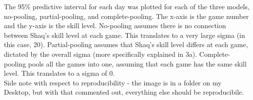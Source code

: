 \documentclass{article}\usepackage[]{graphicx}\usepackage[]{color}
\begin{document}
\noindent The 95\% predictive interval for each day was plotted for each of the three models, no-pooling, partial-pooling, and complete-pooling. The x-axis is the game number and the y-axis is the skill level. No-pooling assumes there is no connection between Shaq's skill level at each game. This translates to a very large sigma (in this case, 20). Partial-pooling assumes that Shaq's skill level differs at each game, dictated by the overall sigma (more specifically explained in 3a). Complete-pooling pools all the games into one, assuming that each game has the same skill level. This translates to a sigma of 0. \\

\noindent *Side note with respect to reproducibility - the image is in a folder on my Desktop, but with that commented out, everything else should be reproducibile. \\
\end{document}
